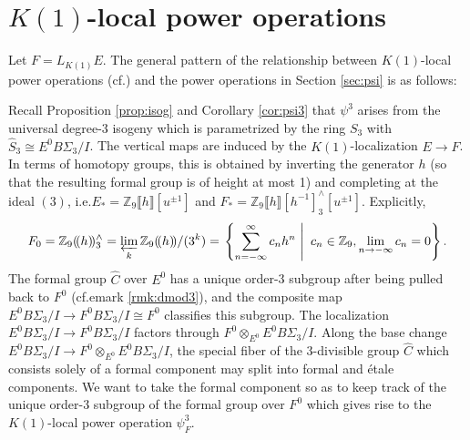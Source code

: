 \documentclass{gtpart}
\theoremstyle{definition}
\theoremstyle{remark}
\newcommand{\mb}[1]{\mathbb{#1}}
\newcommand{\cf}[1]{cf.\thinspace{\cite{#1}}}
\newcommand{\BZ}{{\mb Z}}
\newcommand{\HC}{\widehat{C}}
\newcommand{\HS}{\widehat{S}}
\newcommand{\p}{\psi^3}
\begin{document}
\section{$K(1)$-local power operations}
\label{sec:K(1)}

Let $F = L_{K(1)} E$.  The general pattern of the relationship between $K(1)$-local power operations (\cf{K(1)E_infty}) 
and the power operations in Section \ref{sec:psi} is as follows: 
\begin{center}
\end{center}
Recall Proposition \ref{prop:isog} and Corollary \ref{cor:psi3} that $\p$ arises from the universal degree-3 isogeny 
which is parametrized by the ring $S_3$ with $\HS_3 \cong E^0 B\Sigma_3 / I$.  The 
vertical maps are induced by the $K(1)$-localization $E \to F$.  In terms of 
homotopy groups, this is obtained by inverting the generator $h$ (so that 
the resulting formal group is of height at most 1) and completing at the ideal 
$(3)$, i.e.\thinspace$E_* = \BZ_9 \llbracket h \rrbracket [u^{\pm1}]$ and $F_* = \BZ_9 \llbracket h \rrbracket [h^{-1}]_3^\wedge [u^{\pm1}]$.  
Explicitly, 
\[
 F_0 = \BZ_9 (\!(h)\!)_3^\wedge = \varprojlim_k \BZ_9 (\!(h)\!) /(3^k) = 
 \left.\left\{\sum_{n = -\infty}^{\infty} c_n h^n~\right|~c_n \in \BZ_9, 
 \lim_{n \to -\infty} c_n = 0\right\}.  
\]
The formal group $\HC$ over $E^0$ has a unique order-3 subgroup after being pulled back to $F^0$ (cf.emark \ref{rmk:dmod3}), 
and the composite map $E^0 B\Sigma_3 / I \to F^0 B\Sigma_3 / I \cong F^0$ classifies this subgroup.  
The localization $E^0 B\Sigma_3 / I \to F^0 B\Sigma_3 / I$ factors through $F^0 \otimes_{E^0} E^0 B\Sigma_3 / I$.  
Along the base change $E^0 B\Sigma_3 / I \to F^0 \otimes_{E^0} E^0 B\Sigma_3 / I$, 
the special fiber of the 3-divisible group $\HC$ which consists solely of a formal component may split into formal and \'etale components.  
We want to take the formal component so as to keep track of the unique order-3 subgroup of the formal group over $F^0$ 
which gives rise to the $K(1)$-local power operation $\psi_F^3$.  
\end{document}
